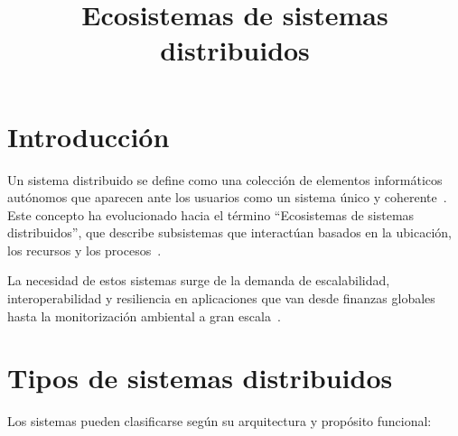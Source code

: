 \documentclass[12pt,a4paper]{article}
\title{Ecosistemas de sistemas distribuidos}
\author{}
\date{}
\begin{document}
\maketitle

\section{Introducción}

Un sistema distribuido se define como una colección de elementos informáticos autónomos que aparecen ante los usuarios como un sistema único y coherente~\cite{r01}. Este concepto ha evolucionado hacia el término ``Ecosistemas de sistemas distribuidos'', que describe subsistemas que interactúan basados en la ubicación, los recursos y los procesos~\cite{r02}.

La necesidad de estos sistemas surge de la demanda de escalabilidad, interoperabilidad y resiliencia en aplicaciones que van desde finanzas globales hasta la monitorización ambiental a gran escala~\cite{r03}.

\section{Tipos de sistemas distribuidos}

Los sistemas pueden clasificarse según su arquitectura y propósito funcional:
\end{document}

